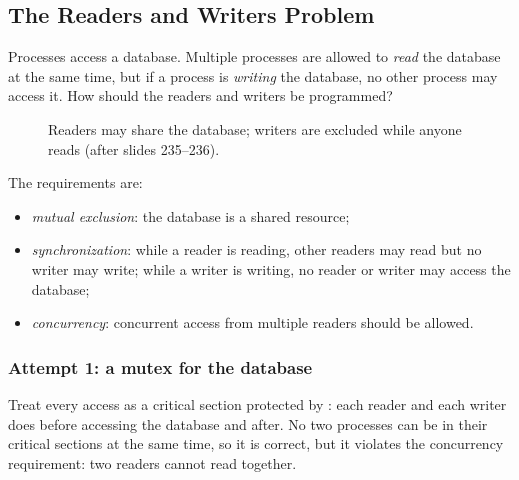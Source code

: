 \subsection{The Readers and Writers Problem}

\begin{definition}
  Processes access a database. Multiple processes are allowed to \emph{read} the database at the same time, but if a process is \emph{writing} the database, no other process may access it. How should the readers and writers be programmed?
\end{definition}

\begin{figure}[htbp]
\centering
{}
\caption{Readers may share the database; writers are excluded while anyone reads (after slides 235--236).}
\label{fig:rw}
\end{figure}

The requirements are:
\begin{itemize}
  \item \emph{mutual exclusion}: the database is a shared resource;
  \item \emph{synchronization}: while a reader is reading, other readers may read but no writer may write; while a writer is writing, no reader or writer may access the database;
  \item \emph{concurrency}: concurrent access from multiple readers should be allowed.
\end{itemize}

\subsubsection{Attempt 1: a mutex for the database}
Treat every access as a critical section protected by : each reader and each writer does  before accessing the database and  after. No two processes can be in their critical sections at the same time, so it is correct, but it violates the concurrency requirement: two readers cannot read together.

